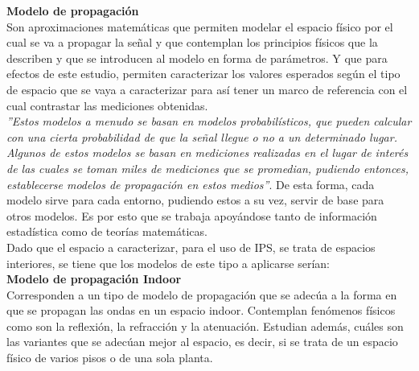 \newpage 

\textbf{Modelo de propagación}\\

Son aproximaciones matemáticas que permiten modelar el espacio físico por el cual se va a propagar la señal y que contemplan los principios físicos que la describen y que se introducen al modelo en forma de parámetros. Y que para efectos de este estudio, permiten caracterizar los valores esperados según el tipo de espacio que se vaya a caracterizar para así tener un marco de referencia con el cual contrastar las mediciones obtenidas.\\

\textit{''Estos modelos a menudo se basan en modelos probabilísticos, que pueden calcular con una cierta probabilidad de que la señal llegue o no a un determinado lugar. Algunos de estos modelos se basan en mediciones realizadas en el lugar de interés de las cuales se toman miles de mediciones que se promedian, pudiendo entonces, establecerse modelos de propagación en estos medios''}\cite{4}. De esta forma, cada modelo sirve para cada entorno, pudiendo estos a su vez, servir de base para otros modelos. Es por esto que se trabaja apoyándose tanto de información estadística como de teorías matemáticas.\\

Dado que el espacio a caracterizar, para el uso de IPS, se trata de espacios interiores, se tiene que los modelos de este tipo a aplicarse serían:\\

\textbf{Modelo de propagación Indoor}\\

Corresponden a un tipo de modelo de propagación que se adecúa a la forma en que se propagan las ondas en un espacio indoor. Contemplan fenómenos físicos como son la reflexión, la refracción y la atenuación. Estudian además, cuáles son las variantes que se adecúan mejor al espacio, es decir, si se trata de un espacio físico de varios 
pisos o de una sola planta.\\

